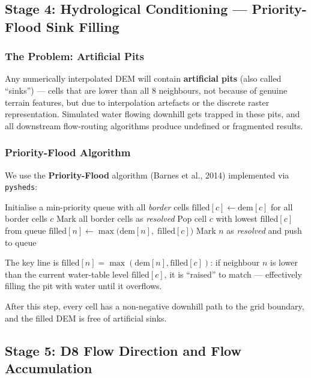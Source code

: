 \documentclass[12pt,a4paper]{article}
\begin{document}
\subsection{Stage 4: Hydrological Conditioning --- Priority-Flood Sink Filling}

\subsubsection{The Problem: Artificial Pits}
Any numerically interpolated DEM will contain \textbf{artificial pits} (also called
``sinks'') --- cells that are lower than all 8 neighbours, not because of genuine terrain
features, but due to interpolation artefacts or the discrete raster representation.
Simulated water flowing downhill gets trapped in these pits, and all downstream
flow-routing algorithms produce undefined or fragmented results.

\subsubsection{Priority-Flood Algorithm}
We use the \textbf{Priority-Flood} algorithm (Barnes et al., 2014) implemented via
\texttt{pysheds}:

\begin{algorithm}[H]
\caption{Priority-Flood Sink Filling}
\begin{algorithmic}[1]
\State Initialise a min-priority queue with all \emph{border} cells
\State $\text{filled}[c] \leftarrow \text{dem}[c]$ for all border cells $c$
\State Mark all border cells as \textit{resolved}
    \State Pop cell $c$ with lowest $\text{filled}[c]$ from queue
        \State $\text{filled}[n] \leftarrow \max\!\bigl(\text{dem}[n],\; \text{filled}[c]\bigr)$
        \State Mark $n$ as \textit{resolved} and push to queue
    \EndFor
\EndWhile
\end{algorithmic}
\end{algorithm}

The key line is $\text{filled}[n] = \max(\text{dem}[n], \text{filled}[c])$: if
neighbour $n$ is lower than the current water-table level $\text{filled}[c]$, it is
``raised'' to match --- effectively filling the pit with water until it overflows.

After this step, every cell has a non-negative downhill path to the grid boundary, and
the filled DEM is free of artificial sinks.

\subsection{Stage 5: D8 Flow Direction and Flow Accumulation}
\end{document}
